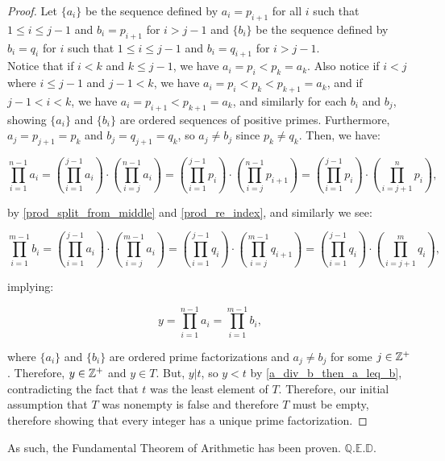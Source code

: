 \begin{proof}
Let $\{ a_i \}$ be the sequence defined by $a_i = p_{i+1}$ for all $i$ such that $1 \le i \le j-1$ and $b_i = p_{i+1}$ for $i > j-1$ and $\{ b_i \} $ be the sequence defined by $b_i = q_i$ for $i$ such that $1 \le i \le j-1$ and $b_i = q_{i+1}$ for $i > j-1$. \\

Notice that if $i <k$ and $k \le j-1$, we have $a_i = p_i < p_k = a_k$. Also notice if $i < j$ where $i \le j-1$ and $j-1 < k$, we have $a_i = p_i < p_{k} < p_{k+1} = a_k$, and if $j-1 < i < k$, we have $a_i = p_{i+1} < p_{k+1} = a_k$, and similarly for each $b_i$ and $b_j$, showing $\{ a_i \}$ and $\{b_i\}$ are ordered sequences of positive primes. Furthermore, $a_j = p_{j+1} = p_k$ and $b_j = q_{j+1} = q_k$, so $a_j \neq b_j$ since $p_k \neq q_k$. Then, we have:

\begin{equation*}
    \prod_{i=1}^{n-1} a_i = \left( \prod_{i=1}^{j-1} a_i \right) \cdot \left( \prod_{i=j}^{n-1} a_i \right) = \left( \prod_{i=1}^{j-1} p_i \right) \cdot \left( \prod_{i=j}^{n-1} p_{i+1} \right) =  \left( \prod_{i=1}^{j-1} p_i \right) \cdot \left( \prod_{i=j+1}^{n} p_{i} \right),
\end{equation*}

by \ref{prod_split_from_middle} and \ref{prod_re_index}, and similarly we see:

\begin{equation*}
\prod_{i=1}^{m-1} b_i = \left( \prod_{i=1}^{j-1} a_i \right) \cdot \left( \prod_{i=j}^{m-1} a_i \right) = \left( \prod_{i=1}^{j-1} q_i \right) \cdot \left( \prod_{i=j}^{m-1} q_{i+1} \right) =  \left( \prod_{i=1}^{j-1} q_i \right) \cdot \left( \prod_{i=j+1}^{m} q_{i} \right),
\end{equation*}

implying:

\begin{equation*}
    y = \prod_{i=1}^{n-1} a_i = \prod_{i=1}^{m-1} b_i,
\end{equation*}

where $\{a_i\}$ and $\{b_i\}$ are ordered prime factorizations and $a_j \neq b_j$ for some $j \in \mathbb{Z}^+$. Therefore, $y \in \mathbb{Z}^+$ and $y \in T$. But, $y | t$, so $y < t$ by \ref{a_div_b_then_a_leq_b}, contradicting the fact that $t$ was the least element of $T$. Therefore, our initial assumption that $T$ was nonempty is false and therefore $T$ must be empty, therefore showing that every integer has a unique prime factorization.
\end{proof} 
As such, the Fundamental Theorem of Arithmetic has been proven. $\mathbb{Q.E.D.}$